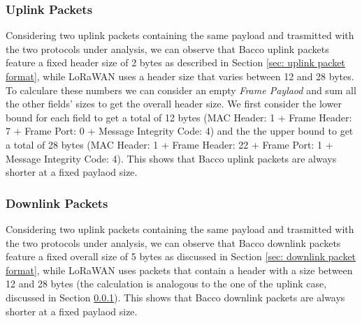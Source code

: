 \subsubsection{Uplink Packets}
\label{subsec: bacco and lorawan uplink packet format}
Considering two uplink packets containing the same payload and trasmitted with the two protocols under
analysis, we can observe that Bacco uplink packets feature a fixed header size of 2 bytes as described in Section \ref{sec:
uplink packet format}, while LoRaWAN uses a header size that varies between 12 and 28 bytes.\\
To calculare these
numbers we can consider an empty \textit{Frame Paylaod} and sum all the other
fields' sizes to get the overall header size. We first consider the lower bound for each field to get a total of
12 bytes (MAC Header: 1 + Frame Header: 7 + Frame Port: 0 + Message Integrity Code: 4) and the the upper bound
to get a total of 28 bytes (MAC Header: 1 + Frame Header: 22 + Frame Port: 1 + Message Integrity Code: 4). This
shows that Bacco uplink packets are always shorter at a fixed paylaod size.

\subsubsection{Downlink Packets}
Considering two uplink packets containing the same payload and trasmitted with the two protocols under
analysis, we can observe that Bacco downlink packets feature a fixed overall size of 5 bytes as discussed in Section \ref{sec: downlink packet format}, while LoRaWAN uses
packets that contain a header with a size between 12 and 28 bytes (the calculation is analogous to the one of the
uplink case, discussed in Section \ref{subsec: bacco and lorawan uplink packet format}). This
shows that Bacco downlink packets are always shorter at a fixed paylaod size.

